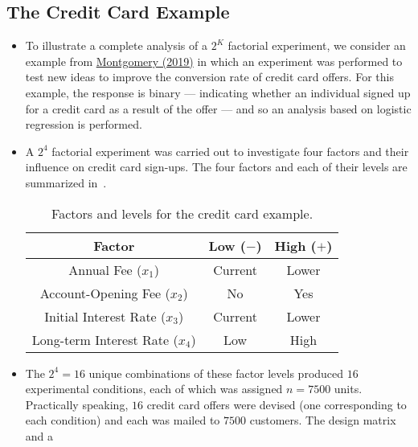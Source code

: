 \subsection{The Credit Card Example}
\begin{itemize}
      \item To illustrate a complete analysis of a $ 2^K $ factorial experiment, we consider an example from \href{https://www.wiley.com/en-ca/Design+and+Analysis+of+Experiments C+10th+Edition-p-9781119492443}{Montgomery (2019)}
            in which an experiment was performed to test new ideas to improve the conversion rate of credit
            card offers. For this example, the response is binary --- indicating whether an individual signed up for
            a credit card as a result of the offer --- and so an analysis based on logistic regression is performed.
      \item A $ 2^4 $ factorial experiment was carried out to investigate four factors and their influence on credit card
            sign-ups. The four factors and each of their levels are summarized in~.
            \begin{table}[!htbp]
                  \centering
                  \caption{Factors and levels for the credit card example.}\label{tab:creditcard1}
                  \begin{tabular}{ccc}
                        \toprule
                        Factor                            & Low ($ - $) & High ($ + $) \\
                        \midrule
                        Annual Fee ($ x_1 $)              & Current     & Lower        \\
                        Account-Opening Fee ($ x_2 $)     & No          & Yes          \\
                        Initial Interest Rate ($ x_3 $)   & Current     & Lower        \\
                        Long-term Interest Rate ($ x_4 $) & Low         & High         \\
                        \bottomrule
                  \end{tabular}
            \end{table}
      \item The $2^4=16$ unique combinations of these factor levels produced $16$ experimental conditions, each
            of which was assigned $n = 7500$ units. Practically speaking, $16$ credit card offers were devised (one
            corresponding to each condition) and each was mailed to $7500$ customers. The design matrix and a

\end{itemize}
